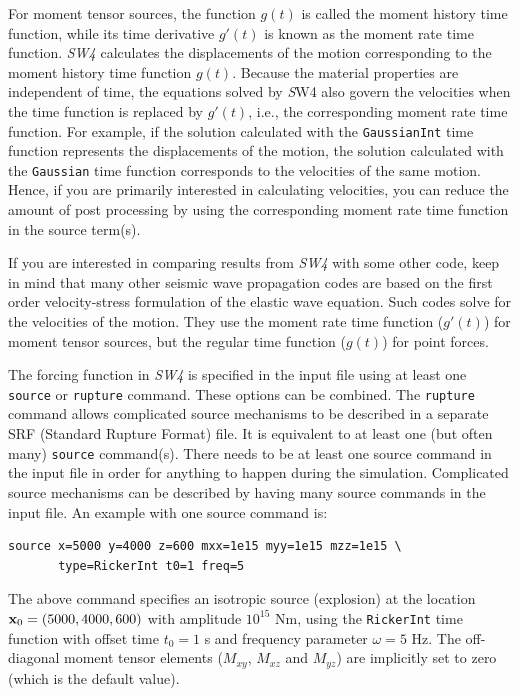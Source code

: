 \documentclass[11pt]{report}
\begin{document}
For moment tensor sources, the function $g(t)$ is called the moment history time function, while its
time derivative $g'(t)$ is known as the moment rate time function. \emph{SW4} calculates the
displacements of the motion corresponding to the moment history time function $g(t)$. Because
the material properties are independent of time, the equations solved by {\emph SW4} also govern the
velocities when the time function is replaced by $g'(t)$, i.e., the corresponding moment rate time
function. For example, if the solution calculated with the {\tt GaussianInt} time function
represents the displacements of the motion, the solution calculated with the {\tt Gaussian} time
function corresponds to the velocities of the same motion. Hence, if you are primarily interested in
calculating velocities, you can reduce the amount of post processing by using the corresponding
moment rate time function in the source term(s). 

If you are interested in comparing results from \emph{SW4} with some other code, keep in mind that
many other seismic wave propagation codes are based on the first order velocity-stress formulation
of the elastic wave equation. Such codes solve for the velocities of the motion. They use the moment
rate time function ($g'(t)$) for moment tensor sources, but the regular time function ($g(t)$) for
point forces.

The forcing function in \emph{SW4} is specified in the input file using at least one {\tt source} or
{\tt rupture} command. These options can be combined. The {\tt rupture} command allows complicated
source mechanisms to be described in a separate SRF (Standard Rupture Format) file. It is equivalent
to at least one (but often many) {\tt source} command(s). There needs to be at least one source
command in the input file in order for anything to happen during the simulation. Complicated source
mechanisms can be described by having many source commands in the input file. An example with one
source command is:
\begin{verbatim}
source x=5000 y=4000 z=600 mxx=1e15 myy=1e15 mzz=1e15 \
       type=RickerInt t0=1 freq=5
\end{verbatim}
The above command specifies an isotropic source (explosion) at the location ${\bf
  x}_0=(5000,4000,600)$ with amplitude $10^{15}$ Nm, using the {\tt RickerInt} time function with
offset time $t_0=1$ s and frequency parameter $\omega=5$ Hz. The off-diagonal moment tensor elements
($M_{xy}$, $M_{xz}$ and $M_{yz}$) are implicitly set to zero (which is the default value).
\end{document}
